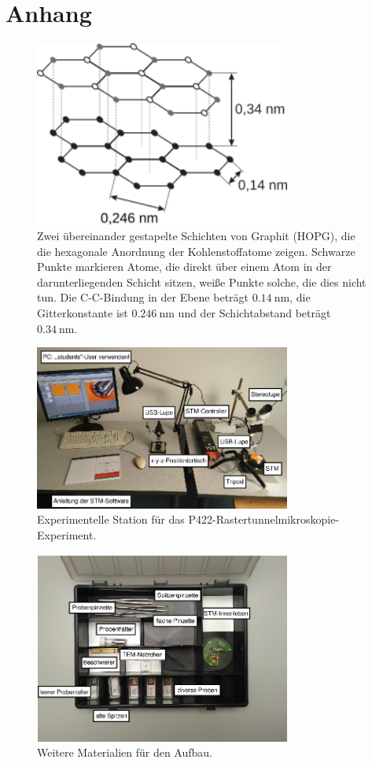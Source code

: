 \chapter{Anhang}

\begin{figure}[htbp]
    \centering
    \includegraphics[width=0.75\textwidth]{figs/Hpg_struktur.png}
    \caption{Zwei übereinander gestapelte Schichten von Graphit (HOPG), die die hexagonale Anordnung der Kohlenstoffatome zeigen. Schwarze Punkte markieren Atome, die direkt über einem Atom in der darunterliegenden Schicht sitzen, weiße Punkte solche, die dies nicht tun. 
    Die C-C-Bindung in der Ebene beträgt $\SI{0.14}{\nano\metre}$, die Gitterkonstante ist $\SI{0.246}{\nano\metre}$ und der Schichtabstand beträgt $\SI{0.34}{\nano\metre}$.  \cite{praktikum}}
    \label{fig:HOPG struktur}
\end{figure} 

\begin{figure}[htbp]
    \centering
    \includegraphics[width=0.75\textwidth]{figs/Versuchsaufbau1.png}
    \caption{Experimentelle Station für das P422-Rastertunnelmikroskopie-Experiment. \cite{praktikum}}
    \label{fig:Versuchaufbau1}    
\end{figure}

\begin{figure}
    \centering
    \includegraphics[width=0.75\textwidth]{figs/Versuch_box}
    \caption{Weitere Materialien für den Aufbau. \cite{praktikum}}
    \label{fig:Versuch box}
\end{figure}